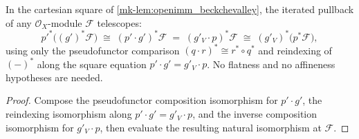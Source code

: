 \begin{lemma}\label{mk-lem:openimm_bc_telescope}
  \leanok

  In the cartesian square of \ref{mk-lem:openimm_beckchevalley}, the iterated pullback of any
  \(\mathcal{O}_X\)-module \(\mathcal{F}\) telescopes:
  \[
    p'^*\bigl((g')^*\mathcal{F}\bigr)
      \;\cong\; (p' \cdot g')^*\mathcal{F}
      \;=\; (g'_V \cdot p)^*\mathcal{F}
      \;\cong\; (g'_V)^*\bigl(p^*\mathcal{F}\bigr),
  \]
  using only the pseudofunctor comparison \((q \cdot r)^* \cong r^* \circ q^*\) and reindexing of
  \((-)^*\) along the square equation \(p' \cdot g' = g'_V \cdot p\). No flatness and no
  affineness hypotheses are needed.
\end{lemma}
\begin{proof}
  Compose the pseudofunctor composition isomorphism for \(p' \cdot g'\), the reindexing
  isomorphism along \(p' \cdot g' = g'_V \cdot p\), and the inverse composition isomorphism for
  \(g'_V \cdot p\), then evaluate the resulting natural isomorphism at \(\mathcal{F}\).
\end{proof}

